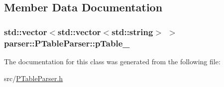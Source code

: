 \subsection{\-Member \-Data \-Documentation}
\hypertarget{classparser_1_1PTableParser_a7190cd2dc71301c0164bbaacabf07942}{
\subsubsection[{p\-Table\-\_\-}]{\setlength{\rightskip}{0pt plus 5cm}std\-::vector$<$std\-::vector$<$std\-::string$>$ $>$ {\bf parser\-::\-P\-Table\-Parser\-::p\-Table\-\_\-}}}\label{da/d8c/classparser_1_1PTableParser_a7190cd2dc71301c0164bbaacabf07942}


\-The documentation for this class was generated from the following file\-:\begin{DoxyCompactItemize}
\item 
src/\hyperlink{PTableParser_8h}{\-P\-Table\-Parser.\-h}\end{DoxyCompactItemize}
